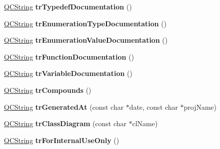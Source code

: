 \begin{DoxyCompactItemize}
\item 
\hypertarget{class_translator_dutch_a1611eb91129bc7fbac2586a1b913710d}{\hyperlink{class_q_c_string}{Q\-C\-String} {\bfseries tr\-Typedef\-Documentation} ()}\label{class_translator_dutch_a1611eb91129bc7fbac2586a1b913710d}

\item 
\hypertarget{class_translator_dutch_ae11f24a699bb6c1becaf521cdac12ab0}{\hyperlink{class_q_c_string}{Q\-C\-String} {\bfseries tr\-Enumeration\-Type\-Documentation} ()}\label{class_translator_dutch_ae11f24a699bb6c1becaf521cdac12ab0}

\item 
\hypertarget{class_translator_dutch_a090e7072c395bcc9a09bf5852b7a043d}{\hyperlink{class_q_c_string}{Q\-C\-String} {\bfseries tr\-Enumeration\-Value\-Documentation} ()}\label{class_translator_dutch_a090e7072c395bcc9a09bf5852b7a043d}

\item 
\hypertarget{class_translator_dutch_a54c0fb7e39b052558da3844673b26e1e}{\hyperlink{class_q_c_string}{Q\-C\-String} {\bfseries tr\-Function\-Documentation} ()}\label{class_translator_dutch_a54c0fb7e39b052558da3844673b26e1e}

\item 
\hypertarget{class_translator_dutch_aeff3c7fbc21cb023b224c101b81210ed}{\hyperlink{class_q_c_string}{Q\-C\-String} {\bfseries tr\-Variable\-Documentation} ()}\label{class_translator_dutch_aeff3c7fbc21cb023b224c101b81210ed}

\item 
\hypertarget{class_translator_dutch_ae2c887f8a9fe5663d722b798b02628e8}{\hyperlink{class_q_c_string}{Q\-C\-String} {\bfseries tr\-Compounds} ()}\label{class_translator_dutch_ae2c887f8a9fe5663d722b798b02628e8}

\item 
\hypertarget{class_translator_dutch_a6675fccca4756f9c0d86797009a4ad7e}{\hyperlink{class_q_c_string}{Q\-C\-String} {\bfseries tr\-Generated\-At} (const char $\ast$date, const char $\ast$proj\-Name)}\label{class_translator_dutch_a6675fccca4756f9c0d86797009a4ad7e}

\item 
\hypertarget{class_translator_dutch_a5dc8187057a8e4f4ca85ad94ade9e82c}{\hyperlink{class_q_c_string}{Q\-C\-String} {\bfseries tr\-Class\-Diagram} (const char $\ast$cl\-Name)}\label{class_translator_dutch_a5dc8187057a8e4f4ca85ad94ade9e82c}

\item 
\hypertarget{class_translator_dutch_ac4cc9aa408e288c1e2b037ec3b23c4f7}{\hyperlink{class_q_c_string}{Q\-C\-String} {\bfseries tr\-For\-Internal\-Use\-Only} ()}\label{class_translator_dutch_ac4cc9aa408e288c1e2b037ec3b23c4f7}


\end{DoxyCompactItemize}
